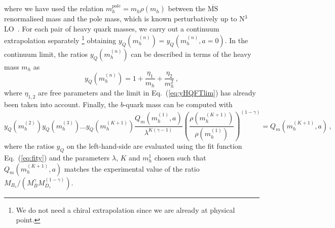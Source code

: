 where we have used the relation  $ m^{pole}_h= m_{h}^{} \rho( m_{h}^{})$
between the $\overline{\mbox{MS}}$ renormalised mass and the pole
mass, which is known perturbatively up to N$^3$LO~\cite{Chetyrkin:1999pq}.
For each pair of heavy quark masses, we carry out a continuum
extrapolation separately
\footnote{We do not need a chiral extrapolation since we are already at physical point.}
obtaining $y_Q( m^{(n)}_h)=y_Q( m^{(n)}_h,a=0)$.
In the continuum limit, the ratios $y_Q( m^{(n)}_h)$ can be described
in terms of the heavy mass $m_h$ as~\cite{ETM:2011zey}
\begin{equation}
  y_Q( m^{(n)}_h) = 1 + \frac{\eta_1}{ m_h}+ \frac{\eta_2}{ m_h^2}\,,
  \label{eq:fity}
\end{equation}
where $\eta_{1,2}$ are free parameters and the limit in
Eq.~(\ref{eq:yHQFTlim}) has already been taken into account.
Finally, the $b$-quark mass can be computed with
\begin{equation}
  y_Q( m^{(2)}_h)y_Q( m^{(3)}_h)...y_Q( m^{(K+1)}_h)\frac{Q_m( m_h^{(1)},a)}{\lambda^{K(\gamma-1)}}
  \left(\frac{ \rho( m_{h}^{(K+1)})}{\rho( m_{h}^{(1)})}\right)^{(1-\gamma)}=Q_m( m_h^{(K+1)},a)
  \,,
\end{equation}
where the ratios $y_Q$ on the left-hand-side are evaluated using the
fit function Eq.~(\ref{eq:fity}) and the parameters $\lambda$, $K$ and
$ m_h^1$ chosen such that $Q_m( m_h^{(K+1)},a)$ matches 
the experimental value of the ratio $M_{B_s}/(M_{B}^\gamma M_{D_s}^{(1-\gamma)})$.


\endinput

